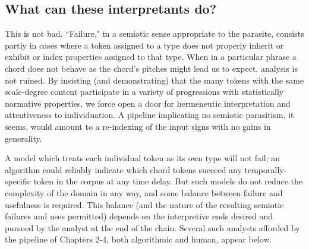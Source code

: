 \subsection{What can these interpretants do?}
This is not bad.  ``Failure," in a semiotic sense appropriate to the parasite, consists partly in cases where a token assigned to a type does not properly inherit or exhibit or index properties assigned to that type.  When in a particular phrase a chord does not behave as the chord's pitches might lead us to expect, analysis is not ruined.  By insisting (and demonstrating) that the many tokens with the same scale-degree content participate in a variety of progressions with statistically normative properties, we force open a door for hermeneutic interpretation and attentiveness to individuation.  A pipeline implicating no semiotic parasitism, it seems, would amount to a re-indexing of the input signs with no gains in generality.

A model which treats each individual token as its own type will not fail; an algorithm could reliably indicate which chord tokens succeed any temporally-specific token in the corpus at any time delay.  But such models do not reduce the complexity of the domain in any way, and some balance between failure and usefulness is required.  This balance (and the nature of the resulting semiotic failures and uses permitted) depends on the interpretive ends desired and pursued by the analyst at the end of the chain.  Several such analysts afforded by the pipeline of Chapters 2-4, both algorithmic and human, appear below.

